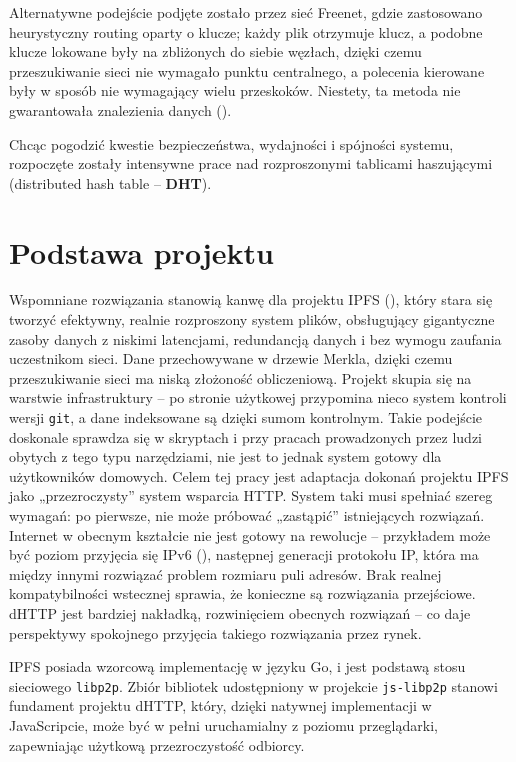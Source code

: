 Alternatywne podejście podjęte zostało przez sieć Freenet, gdzie zastosowano heurystyczny routing oparty o klucze; każdy plik otrzymuje klucz, a podobne klucze lokowane były na zbliżonych do siebie węzłach, dzięki czemu przeszukiwanie sieci nie wymagało punktu centralnego, a polecenia kierowane były w sposób nie wymagający wielu przeskoków. Niestety, ta metoda nie gwarantowała znalezienia danych (\cite{searchingInSmallWorld}).

Chcąc pogodzić kwestie bezpieczeństwa, wydajności i spójności systemu, rozpoczęte zostały intensywne prace nad rozproszonymi tablicami haszującymi (distributed hash table -- \textbf{DHT}).

\section{Podstawa projektu}
\label{sec:podstawaProjektu}
Wspomniane rozwiązania stanowią kanwę dla projektu IPFS (\cite{ipfsWP}), który stara się tworzyć efektywny, realnie rozproszony system plików, obsługujący gigantyczne zasoby danych z niskimi latencjami, redundancją danych i bez wymogu zaufania uczestnikom sieci.  Dane przechowywane w drzewie Merkla, dzięki czemu przeszukiwanie sieci ma niską złożoność obliczeniową. Projekt skupia się na warstwie infrastruktury – po stronie użytkowej przypomina nieco system kontroli wersji \texttt{git}, a dane indeksowane są dzięki sumom kontrolnym. Takie podejście doskonale sprawdza się w skryptach i przy pracach prowadzonych przez ludzi obytych z tego typu narzędziami, nie jest to jednak system gotowy dla użytkowników domowych.
Celem tej pracy jest adaptacja dokonań projektu IPFS jako „przezroczysty” system wsparcia HTTP. System taki musi spełniać szereg wymagań: po pierwsze, nie może próbować „zastąpić” istniejących rozwiązań. Internet w obecnym kształcie nie jest gotowy na rewolucje – przykładem może być poziom przyjęcia się IPv6 (\cite{googleipv6}), następnej generacji protokołu IP, która ma między innymi rozwiązać problem rozmiaru puli adresów. Brak realnej kompatybilności wstecznej sprawia, że konieczne są rozwiązania przejściowe. dHTTP jest bardziej nakładką, rozwinięciem obecnych rozwiązań -- co daje perspektywy spokojnego przyjęcia takiego rozwiązania przez rynek.

IPFS posiada wzorcową implementację w języku Go, i jest podstawą stosu sieciowego \texttt{libp2p}. Zbiór bibliotek udostępniony w projekcie \texttt{js-libp2p} stanowi fundament projektu dHTTP, który, dzięki natywnej implementacji w JavaScripcie, może być w pełni uruchamialny z poziomu przeglądarki, zapewniając użytkową przezroczystość odbiorcy.
